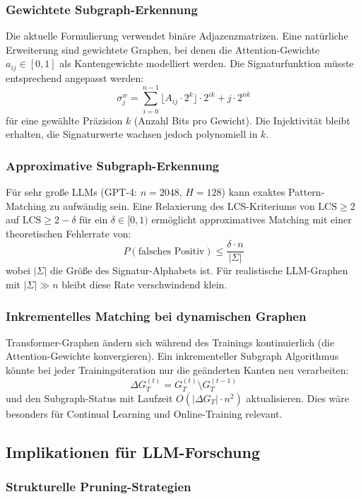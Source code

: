 ﻿\documentclass[a4paper,12pt]{article}
\theoremstyle{definition}
\begin{document}
\subsubsection{Gewichtete Subgraph-Erkennung}

Die aktuelle Formulierung verwendet binäre Adjazenzmatrizen. Eine natürliche
Erweiterung sind gewichtete Graphen, bei denen die Attention-Gewichte
$a_{ij} \in [0,1]$ als Kantengewichte modelliert werden. Die Signaturfunktion
müsste entsprechend angepasst werden:
\[
\sigma_j^w = \sum_{i=0}^{n-1} \lfloor A_{ij} \cdot 2^k \rfloor \cdot 2^{ik} + j \cdot 2^{nk}
\]
für eine gewählte Präzision $k$ (Anzahl Bits pro Gewicht). Die Injektivität
bleibt erhalten, die Signaturwerte wachsen jedoch polynomiell in $k$.

\subsubsection{Approximative Subgraph-Erkennung}

Für sehr große LLMs (GPT-4: $n = 2048$, $H = 128$) kann exaktes Pattern-Matching
zu aufwändig sein. Eine Relaxierung des LCS-Kriteriums von $\mathrm{LCS} \geq 2$
auf $\mathrm{LCS} \geq 2 - \delta$ für ein $\delta \in [0, 1)$ ermöglicht
approximatives Matching mit einer theoretischen Fehlerrate von:
\[
P(\text{falsches Positiv}) \leq \frac{\delta \cdot n}{|\Sigma|}
\]
wobei $|\Sigma|$ die Größe des Signatur-Alphabets ist. Für realistische
LLM-Graphen mit $|\Sigma| \gg n$ bleibt diese Rate verschwindend klein.

\subsubsection{Inkrementelles Matching bei dynamischen Graphen}

Transformer-Graphen ändern sich während des Trainings kontinuierlich
(die Attention-Gewichte konvergieren). Ein inkrementeller Subgraph Algorithmus
könnte bei jeder Trainingsiteration nur die geänderten Kanten neu verarbeiten:
\[
\Delta G_T^{(t)} = G_T^{(t)} \setminus G_T^{(t-1)}
\]
und den Subgraph-Status mit Laufzeit $O(|\Delta G_T| \cdot n^2)$ aktualisieren.
Dies wäre besonders für Continual Learning und Online-Training relevant.

\subsection{Implikationen für LLM-Forschung}

\subsubsection{Strukturelle Pruning-Strategien}
\end{document}
